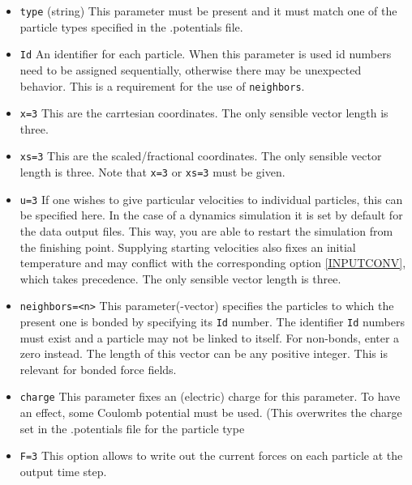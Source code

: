 \begin{itemize}
\item \texttt{type} (string) This parameter must be present and it must match one of the particle types specified in the .potentials file.

\item \texttt{Id} An identifier for each particle. When this parameter is used id numbers need to be assigned sequentially, 
  otherwise there may be unexpected behavior. This is a requirement for the use of \texttt{neighbors}.

\item {\tt x=3} This are the carrtesian coordinates. The only sensible vector length is three.

\item {\tt xs=3} This are the scaled/fractional coordinates. The only sensible vector length is three. Note that {\tt x=3} or {\tt xs=3} must be given.

\item {\tt u=3} If one wishes to give particular velocities to individual particles, this can be specified here. In the case of a dynamics simulation it is set by default for the data output files. This way, you are able to restart the simulation from the finishing point. 
  Supplying starting velocities also fixes an initial temperature and may conflict with the corresponding option 
  \ref{INPUTCONV}, which takes precedence. The only sensible vector length is three.

\item {\tt neighbors=<n>} This parameter(-vector) specifies the particles to which the present one is bonded by specifying 
  its {\tt Id} number. The identifier {\tt Id} numbers must exist and a particle may not be linked to itself. For non-bonds, 
  enter a zero instead. The length of this vector can be any positive integer. This is relevant for bonded force fields.

\item {\tt charge} This parameter fixes an (electric) charge for this parameter. To have an effect, some Coulomb 
  potential must be used. (This overwrites the charge set in the .potentials file for the particle type 

\item {\tt F=3} This option allows to write out the current forces on each particle at the output time step.


\end{itemize}
